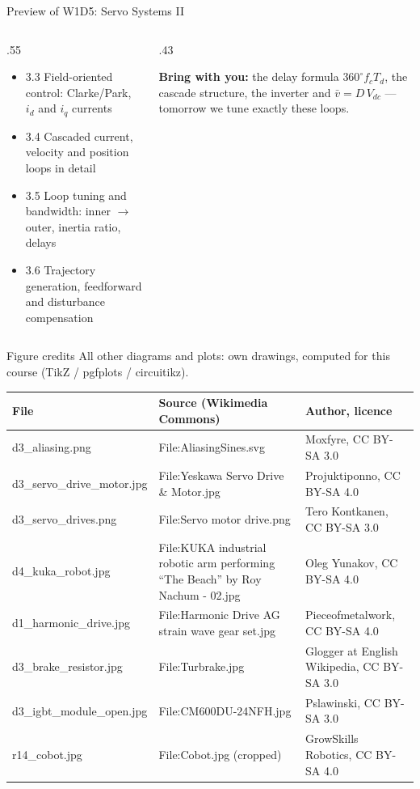 \documentclass[aspectratio=169,10pt]{beamer}
\begin{document}
\begin{frame}{Preview of W1D5: Servo Systems II}
\begin{columns}[T]
\begin{column}{.55\textwidth}
\small
\begin{itemize}\setlength\itemsep{.5mm}
\item 3.3 Field-oriented control: Clarke/Park, $i_d$ and $i_q$ currents
\item 3.4 Cascaded current, velocity and position loops in detail
\item 3.5 Loop tuning and bandwidth: inner $\rightarrow$ outer, inertia ratio, delays
\item 3.6 Trajectory generation, feedforward and disturbance compensation
\end{itemize}
\end{column}
\begin{column}{.43\textwidth}
\begin{notebox}
\small \textbf{Bring with you:} the delay formula $360^\circ f_cT_d$, the cascade structure, the inverter and $\bar v=D\,V_{dc}$ --- tomorrow we tune exactly these loops.
\end{notebox}
\end{column}
\end{columns}
\end{frame}

\begin{frame}{Figure credits}
\scriptsize
All other diagrams and plots: own drawings, computed for this course (TikZ / pgfplots / circuitikz).\\[1mm]
\begin{tabularx}{\textwidth}{@{}l X l@{}}
\toprule
\textbf{File} & \textbf{Source (Wikimedia Commons)} & \textbf{Author, licence}\\
\midrule
d3\_aliasing.png & File:AliasingSines.svg & Moxfyre, CC BY-SA 3.0\\
d3\_servo\_drive\_motor.jpg & File:Yeskawa Servo Drive \& Motor.jpg & Projuktiponno, CC BY-SA 4.0\\
d3\_servo\_drives.png & File:Servo motor drive.png & Tero Kontkanen, CC BY-SA 3.0\\
d4\_kuka\_robot.jpg & File:KUKA industrial robotic arm performing ``The Beach'' by Roy Nachum - 02.jpg & Oleg Yunakov, CC BY-SA 4.0\\
d1\_harmonic\_drive.jpg & File:Harmonic Drive AG strain wave gear set.jpg & Pieceofmetalwork, CC BY-SA 4.0\\
d3\_brake\_resistor.jpg & File:Turbrake.jpg & Glogger at English Wikipedia, CC BY-SA 3.0\\
d3\_igbt\_module\_open.jpg & File:CM600DU-24NFH.jpg & Pslawinski, CC BY-SA 3.0\\
r14\_cobot.jpg & File:Cobot.jpg (cropped) & GrowSkills Robotics, CC BY-SA 4.0\\
\bottomrule
\end{tabularx}
\end{frame}
\end{document}
